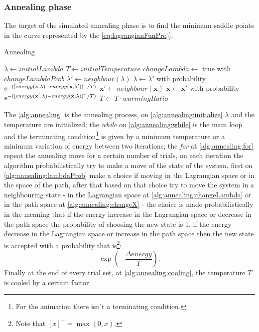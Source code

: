 \documentclass[dissertation.tex]{subfiles}
\begin{document}
\subsubsection{Annealing phase}
The target of the simulated annealing phase is to find the minimum
saddle points in
the curve represented by the
\cref{eq:lagrangianFunProj}.
\begin{algorithm}
 \caption{Annealing}\label{alg:annealing}
 \begin{algorithmic}[1]
   \State $\lambda\gets initialLambda$\label{alg:annealing:initialize}
   \State $T\gets initialTemperature$
   \label{alg:annealing:while}
   \label{alg:annealing:for}
   \State $changeLambda\gets$ true with $changeLambdaProb$\label{alg:annealing:lambdaProb}
   \State $\lambda'\gets neighbour(\lambda)$\label{alg:annealing:changeLambda}
   \State $\lambda\gets \lambda'$ with probability $\mathrm{e}^{-([energy(\mathbf{x},\lambda)-energy(\mathbf{x},\lambda')]^+/T)}$
   \Else
   \State $\mathbf{x}'\gets neighbour(\mathbf{x})$\label{alg:annealing:changeX}
   \State $\mathbf{x}\gets \mathbf{x}'$ with probability $\mathrm{e}^{-([energy(\mathbf{x}',\lambda)-energy(\mathbf{x},\lambda)]^+/T)}$
   \EndIf
   \EndFor
   \State $T\gets T\cdot warmingRatio$\label{alg:annealing:cooling}
   \EndWhile
   \EndProcedure
 \end{algorithmic}
\end{algorithm}

The \cref{alg:annealing} is the annealing process, on
\cref{alg:annealing:initialize} $\lambda$ and the
temperature are initialized; the \emph{while} on
\cref{alg:annealing:while} is the main loop and the terminating
condition\footnote{For the animation there isn't a terminating
  condition.} is given by a minimum temperature or a minimum variation of
energy between two iterations; the \emph{for} at
\cref{alg:annealing:for} repeat the annealing move for a certain
number of trials, on each iteration the algorithm probabilistically
try to make a move of the state of the system, first on
\cref{alg:annealing:lambdaProb} make a choice if moving in the
Lagrangian space or in the space of the path, after that based on that
choice try to move the system in a neighbouring state - in the
Lagrangian space at
\cref{alg:annealing:changeLambda} or in the path space at
\cref{alg:annealing:changeX} - the choice is made
probabilistically in the meaning that if the energy increase in the
Lagrangian space or decrease in the path space the probability of
choosing the new state is 1, if the energy decrease in the Lagrangian
space or increase in the path space then the new state is accepted
with a probability that is\footnote{Note that $[x]^+=\max(0,x)$.}:
$$\exp(-\frac{\Delta energy}{T}).$$
Finally at the end of every trial set,
at \cref{alg:annealing:cooling}, the temperature $T$ is cooled by
a certain factor.
\end{document}
